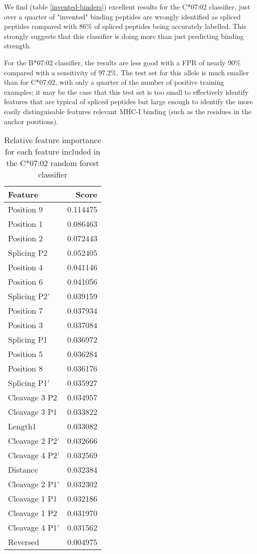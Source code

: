 \documentclass[10pt,a4paper,twoside,twocolumn]{article}
\begin{document}
We find (table \ref{invented-binders}) excellent results for the C*07:02 classifier, just over a quarter of "invented" binding peptides are wrongly identified as spliced peptides compared with 86\% of spliced peptides being accurately labelled. This strongly suggests that this classifier is doing more than just predicting binding strength.

For the B*07:02 classifier, the results are less good with a FPR of nearly 90\% compared with a sensitivity of 97.2\%. The test set for this allele is much smaller than for C*07:02, with only a quarter of the number of positive training examples; it may be the case that this test set is too small to effectively identify features that are typical of spliced peptides but large enough to identify the more easily distinguisable features relevant MHC-I binding (such as the residues in the anchor positions).

\begin{table}
	\centering
\begin{tabular}{lr}
	\toprule
	Feature &         Score \\
		\midrule
	Position 9       &  0.114475 \\
	Position 1       &  0.086463 \\
	Position 2       &  0.072443 \\
	Splicing P2  &  0.052405 \\
	Position 4       &  0.041146 \\
	Position 6       &  0.041056 \\
	Splicing P2'  &  0.039159 \\
	Position 7       &  0.037934 \\
	Position 3       &  0.037084 \\
	Splicing P1  &  0.036972 \\
	Position 5       &  0.036284 \\
	Position 8       &  0.036176 \\
	Splicing P1'  &  0.035927 \\
	Cleavage 3 P2 &  0.034957 \\
	Cleavage 3 P1 &  0.033822 \\
	Length1     &  0.033082 \\
	Cleavage 2 P2' &  0.032666 \\
	Cleavage 4 P2' &  0.032569 \\
	Distance    &  0.032384 \\
	Cleavage 2 P1' &  0.032302 \\
	Cleavage 1 P1 &  0.032186 \\
	Cleavage 1 P2 &  0.031970 \\
	Cleavage 4 P1' &  0.031562 \\
	Reversed    &  0.004975 \\
	\bottomrule
\end{tabular}
\caption{Relative feature importance for each feature included in the C*07:02 random forest classifier}
\label{feature-importance}
\end{table}
\end{document}
